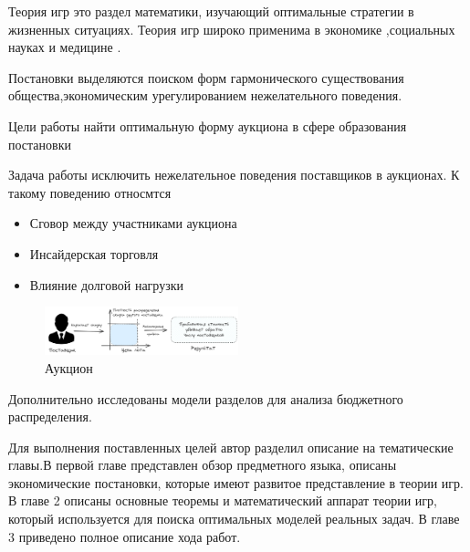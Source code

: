 Теория игр это раздел математики, изучающий оптимальные стратегии в жизненных ситуациях. Теория игр широко применима в экономике \cite{baron1989bargaining}\cite{},социальных науках \cite{arrow2012social} и медицине \cite{segev2005kidney}.


Постановки выделяются поиском форм гармонического существования общества,экономическим урегулированием нежелательного поведения.

Цели работы найти оптимальную форму аукциона в сфере образования постановки 

Задача работы исключить нежелательное поведения поставщиков в аукционах. К такому поведению относмтся
\begin{itemize}
    \item Сговор между участниками аукциона
    \item Инсайдерская торговля 
    \item Влияние долговой нагрузки
\end{itemize}


\begin{figure}[h]
    \centering
    \includegraphics[width=0.5\textwidth]{assets/settings/auction_goal.excalidraw.png}
    \caption{Аукцион}
\end{figure}

Дополнительно исследованы модели разделов для анализа бюджетного распределения.

Для выполнения поставленных целей автор разделил описание на тематические главы.В первой главе представлен обзор предметного языка, описаны экономические постановки, которые имеют развитое представление в теории игр.
В главе 2 описаны основные теоремы и математический аппарат теории игр, который используется для поиска оптимальных моделей реальных задач. В главе 3 приведено полное описание хода работ.

 
 



 